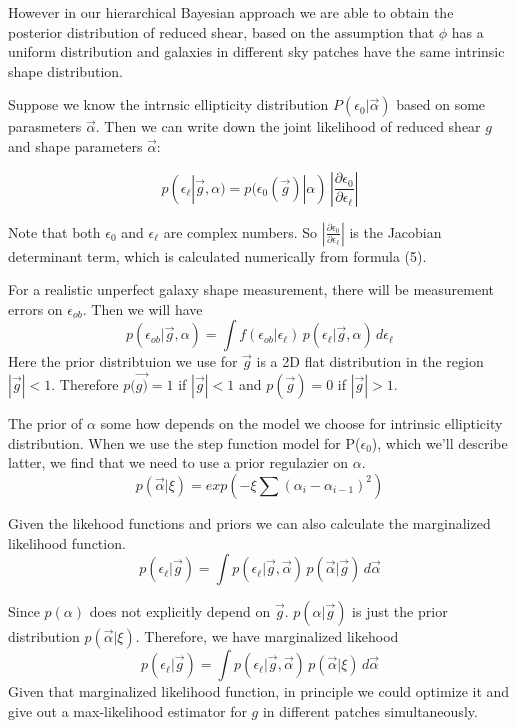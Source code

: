 \documentclass[useAMS,usenatbib]{mn2e}
\begin{document}
However in our hierarchical Bayesian approach we are able to obtain
the posterior distribution of reduced shear, based on the assumption that $\phi$ has
a uniform distribution and galaxies in different sky patches have
the same intrinsic shape distribution.

Suppose we know the intrnsic ellipticity distribution $P(\epsilon_{0}|\vec{\alpha})$
based on some parasmeters $\vec{\alpha}$. Then we can write down the joint likelihood
of reduced shear $g$ and shape parameters $\vec{\alpha}$:

\begin{equation}
p(\epsilon_{\ell}|\vec{g},\alpha)=p(\epsilon_{0}(\vec{g})|\alpha)\,|\frac{\partial\epsilon_{0}}{\partial\epsilon_{\ell}}|
\end{equation}



Note that both $\epsilon_{0}$ and $\epsilon_{\ell}$ are complex numbers. So
$|\frac{\partial\epsilon_{0}}{\partial\epsilon_{\ell}}|$ is the Jacobian
determinant term, which is calculated numerically from formula
(5).

For a realistic unperfect galaxy shape measurement, there will be measurement errors on $\epsilon_{ob}$. Then we will have 
\begin{equation}
p(\epsilon_{ob}|\vec{g},\alpha)=\int f(\epsilon_{ob}|\epsilon_{\ell})\, p(\epsilon_{\ell}|\vec{g},\alpha)\,d\epsilon_{\ell}
\end{equation}
Here the prior distribtuion we use for $\vec{g}$ is a 2D flat distribution
in the region $|\vec{g}|<1$. Therefore $p(\vec{g)}=1$ if $|\vec{g}|<1$
and $p(\vec{g})=0$ if $|\vec{g}|>1$.

The prior of $\alpha$ some how depends on the model we choose for
intrinsic ellipticity distribution. When we use the step function
model for P($\epsilon_{0}$), which we'll describe latter, we find that
we need to use a prior regulazier on $\alpha$. 
\begin{equation}
p(\vec{\alpha}|\xi)=exp(-\xi\sum(\alpha_{i}-\alpha_{i-1})^{2})
\end{equation}

Given the likehood functions and priors we can also calculate the marginalized likelihood function. 
\begin{equation}
p(\epsilon_{\ell}|\vec{g})=\int p(\epsilon_{\ell}|\vec{g},\vec{\alpha})\,p(\vec{\alpha}|\vec{g})\,d\vec{\alpha}
\end{equation}

Since $p(\alpha)$ does not explicitly depend on $\vec{g}$. $p(\alpha|\vec{g})$ is
just the prior distribution $p(\vec{\alpha}|\xi)$. Therefore, we have
marginalized likehood 
\begin{equation}
p(\epsilon_{\ell}|\vec{g})=\int p(\epsilon_{\ell}|\vec{g},\vec{\alpha})\, p(\vec{\alpha}|\xi)\,d\vec{\alpha}
\end{equation}
Given that marginalized likelihood function, in principle we could optimize it and give out a max-likelihood estimator for $g$
in different patches simultaneously.
\end{document}
